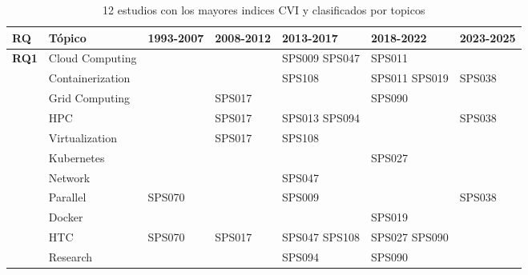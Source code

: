 \begin{table*}[htbp]
	\centering
	\caption{12 estudios con los mayores indices CVI y clasificados por topicos}
	\label{table:highest_CVI}
	\renewcommand{\arraystretch}{1.2}
	\setlength{\tabcolsep}{6pt}
	\begin{tabularx}{\textwidth}{p{0.8cm}p{2.5cm}>{\raggedright\arraybackslash}X>{\raggedright\arraybackslash}X>{\raggedright\arraybackslash}X>{\raggedright\arraybackslash}X>{\raggedright\arraybackslash}X}
		\toprule
		\textbf{RQ}                           & \textbf{Tópico}         & \textbf{1993-2007} & \textbf{2008-2012} & \textbf{2013-2017} & \textbf{2018-2022} & \textbf{2023-2025} \\
		\midrule
		\multirow{12}{*}[0em]{\textbf{RQ1}}   & Cloud Computing         &        			 &                    & SPS009 SPS047	   & SPS011				&                	 \\
		\addlinespace[0.3em]
		                                      & Containerization        &        			 &                    & SPS108             & SPS011 SPS019   	& SPS038 			 \\
		\addlinespace[0.3em]
		                                      & Grid Computing          &        			 & SPS017			  &                    & SPS090             &                    \\
		\addlinespace[0.3em]
		                                      & HPC                     &        			 & SPS017             & SPS013 SPS094      & 					& SPS038        	 \\
		\addlinespace[0.3em]
		                                      & Virtualization          &        			 & SPS017             & SPS108 			   &                    &                    \\
		\addlinespace[0.3em]
		                                      & Kubernetes              &        			 &                    &                    & SPS027      		&                    \\
		\addlinespace[0.3em]
		                                      & Network                 &        			 &                    & SPS047             &                    &                    \\
		\addlinespace[0.3em]
		                                      & Parallel                & SPS070 			 &                    & SPS009             &                    & SPS038             \\
		\addlinespace[0.3em]
		                                      & Docker                  &        			 &                    &                    & SPS019				&                    \\
		\addlinespace[0.3em]
		                                      & HTC                     & SPS070 			 & SPS017             & SPS047 SPS108      & SPS027 SPS090      &                    \\
		\midrule
		\multirow{0}{*}[1.2em]{\textbf{RQ2}}  & Research                &        			 &                    & SPS094             & SPS090 			&            		 \\
		\bottomrule
	\end{tabularx}
\end{table*}

